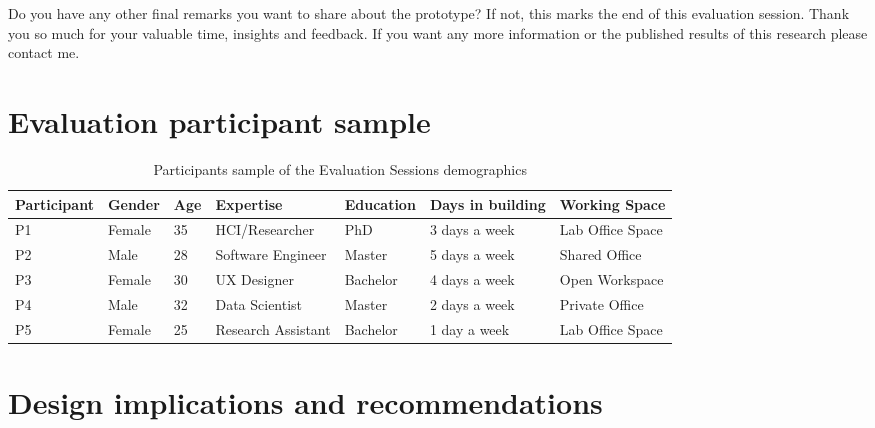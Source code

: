 \begin{appendices}
Do you have any other final remarks you want to share about the prototype?  If not, this marks the end of this evaluation session. Thank you so much for your valuable time, insights and feedback. If you want any more information or the published results of this research please contact me.\\

\newpage

\section{Evaluation participant sample}
\label{appendix:participants}

\begin{table}[h!]
\centering
\begin{tabular}{| p{2cm} | p{1.5cm} | p{1cm} | p{3cm} | p{2cm} | p{3cm} | p{3cm} |}
\hline
\textbf{Participant} & \textbf{Gender} & \textbf{Age} & \textbf{Expertise} & \textbf{Education} & \textbf{Days in building} & \textbf{Working Space} \\ 
\hline
P1 & Female & 35 & HCI/Researcher & PhD & 3 days a week & Lab Office Space \\ 
\hline
P2 & Male & 28 & Software Engineer & Master & 5 days a week & Shared Office \\ 
\hline
P3 & Female & 30 & UX Designer & Bachelor & 4 days a week & Open Workspace \\ 
\hline
P4 & Male & 32 & Data Scientist & Master & 2 days a week & Private Office \\ 
\hline
P5 & Female & 25 & Research Assistant & Bachelor & 1 day a week & Lab Office Space \\ 
\hline
\end{tabular}
\caption{Participants sample of the Evaluation Sessions demographics}
\label{table:participants}
\end{table}

\section{Design implications and recommendations}
\label{appendix:implications}



\end{appendices}
